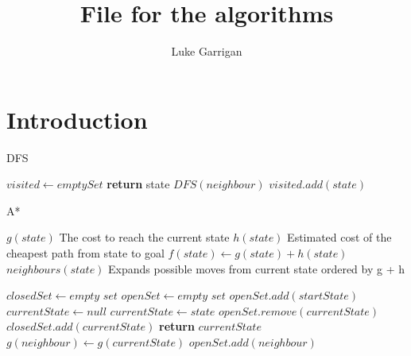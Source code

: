 \documentclass[progress]{cmpreport}
\title{File for the algorithms}
\author{Luke Garrigan}
\begin{document}
	
	
	\section{Introduction}

	

	\makeatletter
	\def\BState{\State\hskip-\ALG@thistlm}
	\makeatother
    \begin{algorithm}
		\caption{DFS}\label{dfs}
		\begin{algorithmic}[1]
			\State $visited \gets emptySet$
					\State \textbf{return} state
				\EndIf
						\State	$DFS(neighbour)$
					\EndIf
					\EndFor
					\State $visited.add(state)$
			\EndProcedure
		\end{algorithmic}
	\end{algorithm}
	
	
	
	
			
	\begin{algorithm}
		\caption{A*}\label{Astar}
		\begin{algorithmic}[1]
			\State $g(state)$ \Comment The cost to reach the current state
			\State $h(state)$ \Comment Estimated cost of the cheapest path from state to goal
			\State $f(state) \gets g(state)+h(state)$
			\State $neighbours(state)$ \Comment Expands possible moves from current state ordered by g + h
			
			\State $closedSet \gets \textit{empty set}$
			\State $openSet \gets \textit{empty set}$
			\State $openSet.add(startState)$
				\State $currentState \gets null$
					\State $currentState \gets state$
					\EndIf
				\EndFor
					\State $openSet.remove(currentState)$
					\State $closedSet.add(currentState)$
					\State \textbf{return} $currentState$
					\EndIf
							\State$g(neighbour) \gets g(currentState)$
							\EndIf	
						\Else
							\State $openSet.add(neighbour)$	
						\EndIf
					\EndIf
				
			\EndFor
			\EndWhile
			\EndProcedure
		\end{algorithmic}
	\end{algorithm}
	
\end{document}
